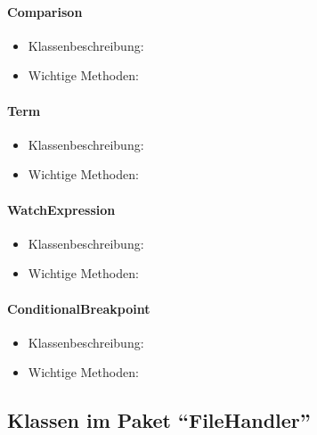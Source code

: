 \documentclass[parskip=full]{scrartcl}
\begin{document}
\paragraph{Comparison}
\begin{itemize}
\item Klassenbeschreibung: \\

\item Wichtige Methoden:\\
\end{itemize}
\paragraph{Term}
\begin{itemize}
\item Klassenbeschreibung: \\

\item Wichtige Methoden:\\


\end{itemize}
\paragraph{WatchExpression}
\begin{itemize}
\item Klassenbeschreibung: \\

\item Wichtige Methoden:\\


\end{itemize}
\paragraph{ConditionalBreakpoint}
\begin{itemize}
\item Klassenbeschreibung: \\

\item Wichtige Methoden:\\


\end{itemize}

\subsection{Klassen im Paket \enquote{FileHandler}}
\end{document}

